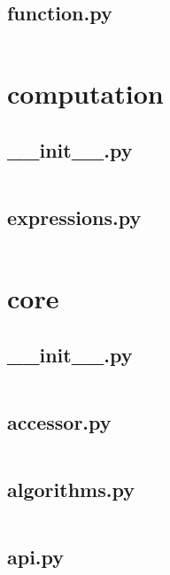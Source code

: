 \documentclass{article}
\begin{document}
\subsection{function.py}
\inputminted{python}{/home/dufferzafar/dev/@clones/pandas/pandas/compat/numpy/function.py}
\newpage

\section{computation}

\subsection{\_\_init\_\_.py}
\inputminted{python}{/home/dufferzafar/dev/@clones/pandas/pandas/computation/__init__.py}
\newpage

\subsection{expressions.py}
\inputminted{python}{/home/dufferzafar/dev/@clones/pandas/pandas/computation/expressions.py}
\newpage

\section{core}

\subsection{\_\_init\_\_.py}
\inputminted{python}{/home/dufferzafar/dev/@clones/pandas/pandas/core/__init__.py}
\newpage

\subsection{accessor.py}
\inputminted{python}{/home/dufferzafar/dev/@clones/pandas/pandas/core/accessor.py}
\newpage

\subsection{algorithms.py}
\inputminted{python}{/home/dufferzafar/dev/@clones/pandas/pandas/core/algorithms.py}
\newpage

\subsection{api.py}
\inputminted{python}{/home/dufferzafar/dev/@clones/pandas/pandas/core/api.py}
\newpage
\end{document}
